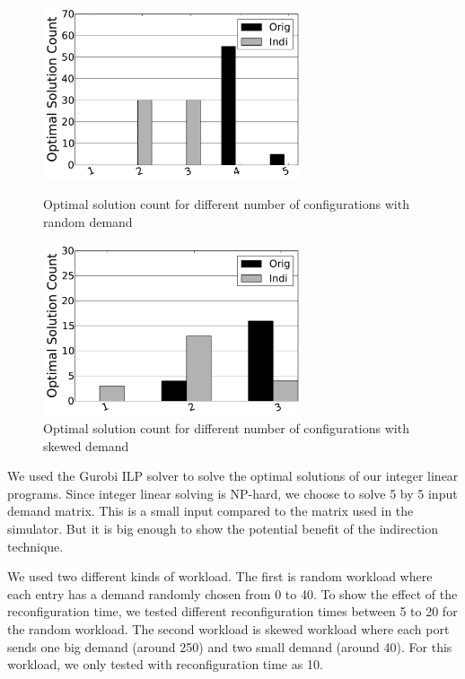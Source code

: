 \begin{figure}
	\centering
	\begin{minipage}{3in}%
		\includegraphics[width=3in]{figures/avg-5-rand}
		\caption{Optimal solution count for different number of configurations with random demand}
		\label{fig:5rand}
	\end{minipage}%
	\qquad
	\begin{minipage}{3in}%
		\includegraphics[width=3in]{figures/avg-5-skew}
		\caption{Optimal solution count for different number of configurations with skewed demand}
		\label{fig:5skew}
	\end{minipage}%
\end{figure}

We used the Gurobi ILP solver to solve the optimal solutions of our
integer linear programs. Since integer linear solving is NP-hard, we
choose to solve 5 by 5 input demand matrix. This is a small input
compared to the matrix used in the simulator. But it is big enough to
show the potential benefit of the indirection technique.

We used two different kinds of workload. The first is random workload
where each entry has a demand randomly chosen from 0 to 40. To show the
effect of the reconfiguration time, we tested different reconfiguration
times between 5 to 20 for the random workload. The second workload is
skewed workload where each port sends one big demand (around 250) and
two small demand (around 40). For this workload, we only tested with
reconfiguration time as 10. 

